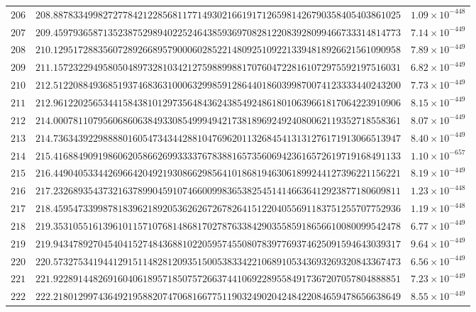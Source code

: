 \documentclass[12pt,reqno]{amsart}
\theoremstyle{remark}
\begin{document}
\begin{longtable}{clc}
$206$ & $208.8878334998272778421228568117714930216619171265981426790358405403861025$ & $1.09\times 10^{-448}$ \\
$207$ & $209.4597936587135238752989402252464385936970828122083928099466733314814773$ & $7.14\times 10^{-449}$ \\
$208$ & $210.1295172883560728926689579000602852214809251092213394818926621561090958$ & $7.89\times 10^{-449}$ \\
$209$ & $211.1572322949580504897328103421275988998817076047228161072975592197516031$ & $6.82\times 10^{-449}$ \\
$210$ & $212.5122088493685193746836310006329985912864401860399870074123333440243200$ & $7.73\times 10^{-449}$ \\
$211$ & $212.9612202565344158438101297356484362438549248618010639661817064223910906$ & $8.15\times 10^{-449}$ \\
$212$ & $214.0007811079560686063849330854999494217381896924924080062119352718558361$ & $8.07\times 10^{-449}$ \\
$213$ & $214.7363439229888801605473434428810476962011326845413131276171913066513947$ & $8.40\times 10^{-449}$ \\
$214$ & $215.4168849091986062058662699333376783881657356069423616572619719168491133$ & $1.10\times 10^{-657}$ \\
$215$ & $216.4490405334426966420492193086629856410186819463061899244127396221156221$ & $8.19\times 10^{-449}$ \\
$216$ & $217.2326893543732163789904591074660099836538254514146636412923877180609811$ & $1.23\times 10^{-448}$ \\
$217$ & $218.4595473399878183962189205362626726782641512204055691183751255707752936$ & $1.19\times 10^{-448}$ \\
$218$ & $219.3531055161396101157107681486817027876338429035585918656610080099542478$ & $6.77\times 10^{-449}$ \\
$219$ & $219.9434789270454041527484368810220595745508078397769374625091594643039317$ & $9.64\times 10^{-449}$ \\
$220$ & $220.5732753419441291511482812093515005383342210689105343693269320843367473$ & $6.56\times 10^{-449}$ \\
$221$ & $221.9228914482691604061895718507572663744106922895584917367207057804888851$ & $7.23\times 10^{-449}$ \\
$222$ & $222.2180129974364921958820747068166775119032490204248422084659478656638649$ & $8.55\times 10^{-449}$ \\

\end{longtable}
\end{document}
